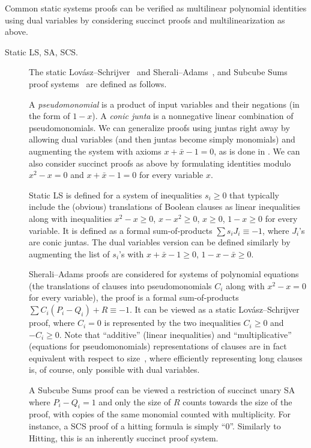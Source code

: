 \documentclass[11pt]{article}
\newcommand{\scterm}[1]{{\textrm{\sc #1}}}
\newcommand{\hit}{\scterm{Hitting}}
\newcommand{\ls}{\scterm{LS}}
\newcommand{\sa}{\scterm{SA}}
\newcommand{\scs}{\scterm{SCS}}
\numberwithin{equation}{section}
\begin{document}
Common static systems proofs can be verified 
as multilinear polynomial identities using dual variables
by considering succinct proofs and multilinearization as above.
\begin{description}
\item[Static {\ls}, {\sa}, {\scs}.] The static Lov\'asz--Schrijver~\cite{GHP02} and Sherali--Adams~\cite{DMR09,ALN16}, and Subcube Sums proof systems~\cite{FMSV20} are defined as follows.

A \emph{pseudomonomial} is a product of input variables and their negations (in the form of $1-x$). A \emph{conic junta} is a nonnegative linear combination of pseudomonomials. We can generalize proofs using juntas right away by allowing dual variables (and then juntas become simply monomials) and augmenting the system with axioms $x+\bar{x}-1=0$, as is done in \cite{DMR09,dRLNS21}. We can also consider succinct proofs as above by formulating identities modulo $x^2-x=0$ and $x+\bar{x}-1=0$ for every variable $x$.

Static {\ls} is defined for a system of inequalities $s_i\ge0$
that typically include the (obvious) translations of Boolean clauses as linear inequalities
along with inequalities $x^2-x\ge0$, $x-x^2\ge0$, $x\ge0$, $1-x\ge0$ for every variable. 
It is defined as a formal sum-of-products $\sum s_i J_i \equiv -1$,
where $J_i$'s are conic juntas. The dual variables version can be defined
similarly by augmenting the list of $s_i$'s with $x+\bar{x}-1\ge 0$, $1-x-\bar{x}\ge0$.

Sherali--Adams proofs are considered for systems of polynomial equations
(the translations of clauses into pseudomonomials $C_i$ along with $x^2-x=0$
for every variable), the proof is a formal sum-of-products
$\sum C_i (P_i-Q_i) + R \equiv -1$. It can be viewed as a static Lov\'asz--Schrijver
proof, where $C_i=0$ is represented by the two inequalities $C_i\ge0$ and $-C_i\ge0$.
Note that ``additive'' (linear inequalities) 
and ``multiplicative'' (equations for pseudomonomials)
representations of clauses are in fact equivalent with respect to size~\cite[Lemmas 3.1, 3.2]{GHP02},
where efficiently representing long clauses is, of course, only possible with dual variables.

A Subcube Sums proof can be viewed a restriction of succinct unary {\sa} where $P_i-Q_i=1$ and only the size of $R$ counts towards the size of the proof, with copies of the same monomial counted with multiplicity. For instance, a {\scs} proof of a hitting formula is simply ``$0$''. Similarly to {\hit}, this is an inherently succinct proof system.


\end{description}
\end{document}
